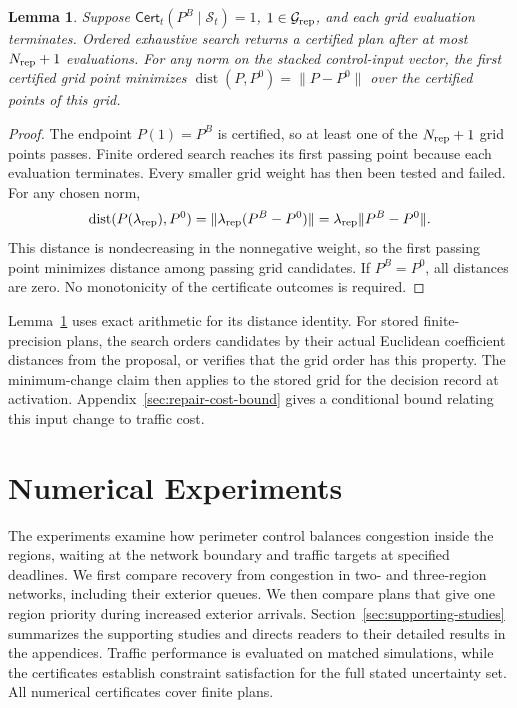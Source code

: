 \documentclass[final]{cas-sc}
\theoremstyle{definition}
\theoremstyle{plain}
\newtheorem{lemma}{Lemma}
\theoremstyle{definition}
\theoremstyle{plain}
\newcommand{\appref}[1]{Appendix~\ref{#1}}
\begin{document}
\begin{lemma}
\label{thm:repair-grid}
Suppose $\mathsf{Cert}_t(P^{B}\mid\mathcal S_t)=1$,
$1\in\mathcal G_{\rm rep}$, and each grid evaluation terminates.
Ordered exhaustive search returns a certified plan after at most
$N_{\rm rep}+1$ evaluations. For any norm on the stacked control-input
vector, the first certified grid point minimizes
$\operatorname{dist}(P,P^{0})=\|P-P^{0}\|$ over the certified points of
this grid.
\end{lemma}

\begin{proof}
The endpoint $P(1)=P^{B}$ is certified, so at least one of the
$N_{\rm rep}+1$ grid points passes. Finite ordered search reaches its
first passing point because each evaluation terminates. Every smaller
grid weight has then been tested and failed. For any chosen norm,
\[
\operatorname{dist}(P(\lambda_{\rm rep}),P^{0})
=\|\lambda_{\rm rep}(P^{B}-P^{0})\|
=\lambda_{\rm rep}\|P^{B}-P^{0}\|.
\]
This distance is nondecreasing in the nonnegative weight, so the first
passing point minimizes distance among passing grid candidates. If
$P^{B}=P^{0}$, all distances are zero. No monotonicity of the
certificate outcomes is required.
\end{proof}

Lemma~\ref{thm:repair-grid} uses exact arithmetic for its distance identity.
For stored finite-precision plans, the search orders candidates by
their actual Euclidean coefficient distances from the proposal, or
verifies that the grid order has this property. The minimum-change
claim then applies to the stored grid for the decision record at
activation. \appref{sec:repair-cost-bound} gives a conditional bound relating
this input change to traffic cost.

\section{Numerical Experiments}
\label{sec:new-evidence}

The experiments examine how perimeter control balances congestion inside
the regions, waiting at the network boundary and traffic targets at
specified deadlines. We first compare recovery from congestion in
two- and three-region networks, including their exterior queues.
We then compare plans that give one region priority during increased
exterior arrivals. Section~\ref{sec:supporting-studies}
summarizes the supporting studies and directs readers to their detailed
results in the appendices. Traffic performance
is evaluated on matched simulations, while
the certificates establish constraint satisfaction for the full stated
uncertainty set. All numerical certificates cover finite plans.
\end{document}
